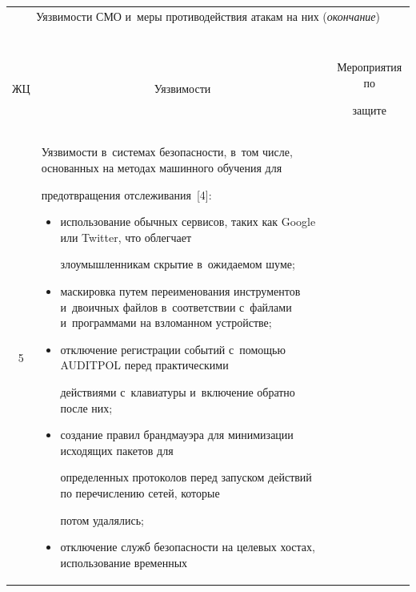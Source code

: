 \begin{table}\small  %

\label{s5}

\begin{center}

\tabcolsep=3pt

\begin{tabular}{|c|p{70mm}|p{46mm}|}

\multicolumn{3}{c}{Уязвимости СМО и~меры противодействия атакам на них (\textit{окончание})}\\

\multicolumn{3}{c}{\ }\\[-6pt]

\hline

ЖЦ&\multicolumn{1}{c|}{Уязвимости}&\multicolumn{1}{c|}{Мероприятия по 

защите}\\

\hline

5&Уязвимости в~системах безопас\-ности, в~том чис\-ле, основанных на методах машинного обуче\-ния для 

предотвращения отслеживания~[4]:\vspace*{-6pt}

\begin{itemize}

\addtolength{\itemsep}{-6pt}

\item использование обычных сервисов, таких как Google или Twitter, что облегчает 

злоумышленникам скрытие в~ожидаемом шуме; 

\item маскировка путем переименования инструментов и~двоичных файлов в~соответствии с~файлами и~программами на взломанном устройстве;

\item отключение регистрации событий с~помощью AUDITPOL перед практическими 

действиями с~клавиатуры и~включение обратно после них;

\item создание правил брандмауэра для минимизации исходящих пакетов для 

определенных протоколов перед запуском действий по пе\-ре\-чис\-ле\-нию сетей, которые 

потом удалялись;

\item отключение служб безопас\-ности на целевых хостах, использование временных 


\end{itemize}
\end{tabular}
\end{center}
\end{table}
